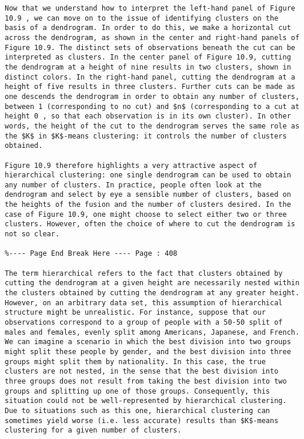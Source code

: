 \documentclass[10pt]{article}
\begin{document}
\begin{verbatim}
Now that we understand how to interpret the left-hand panel of Figure 10.9 , we can move on to the issue of identifying clusters on the basis of a dendrogram. In order to do this, we make a horizontal cut across the dendrogram, as shown in the center and right-hand panels of Figure 10.9. The distinct sets of observations beneath the cut can be interpreted as clusters. In the center panel of Figure 10.9, cutting the dendrogram at a height of nine results in two clusters, shown in distinct colors. In the right-hand panel, cutting the dendrogram at a height of five results in three clusters. Further cuts can be made as one descends the dendrogram in order to obtain any number of clusters, between 1 (corresponding to no cut) and $n$ (corresponding to a cut at height 0 , so that each observation is in its own cluster). In other words, the height of the cut to the dendrogram serves the same role as the $K$ in $K$-means clustering: it controls the number of clusters obtained.

Figure 10.9 therefore highlights a very attractive aspect of hierarchical clustering: one single dendrogram can be used to obtain any number of clusters. In practice, people often look at the dendrogram and select by eye a sensible number of clusters, based on the heights of the fusion and the number of clusters desired. In the case of Figure 10.9, one might choose to select either two or three clusters. However, often the choice of where to cut the dendrogram is not so clear.

%---- Page End Break Here ---- Page : 408

The term hierarchical refers to the fact that clusters obtained by cutting the dendrogram at a given height are necessarily nested within the clusters obtained by cutting the dendrogram at any greater height. However, on an arbitrary data set, this assumption of hierarchical structure might be unrealistic. For instance, suppose that our observations correspond to a group of people with a 50-50 split of males and females, evenly split among Americans, Japanese, and French. We can imagine a scenario in which the best division into two groups might split these people by gender, and the best division into three groups might split them by nationality. In this case, the true clusters are not nested, in the sense that the best division into three groups does not result from taking the best division into two groups and splitting up one of those groups. Consequently, this situation could not be well-represented by hierarchical clustering. Due to situations such as this one, hierarchical clustering can sometimes yield worse (i.e. less accurate) results than $K$-means clustering for a given number of clusters.


\end{verbatim}
\end{document}
